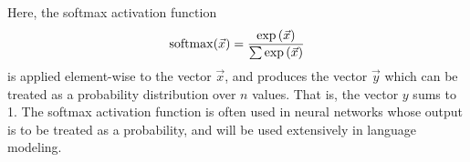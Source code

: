 Here, the softmax activation function
\begin{equation}
    \operatorname{softmax}(\vec x) = \frac{\exp\left(\vec x\right)}{\sum\exp\left(\vec x\right)} \label{eq:neural-networks:softmax}
\end{equation}
is applied element-wise to the vector $\vec x$, and produces the vector $\vec y$ which can be treated as a probability distribution over $n$ values.
That is, the vector $y$ sums to 1.
The softmax activation function is often used in neural networks whose output is to be treated as a probability, and will be used extensively in language modeling.

